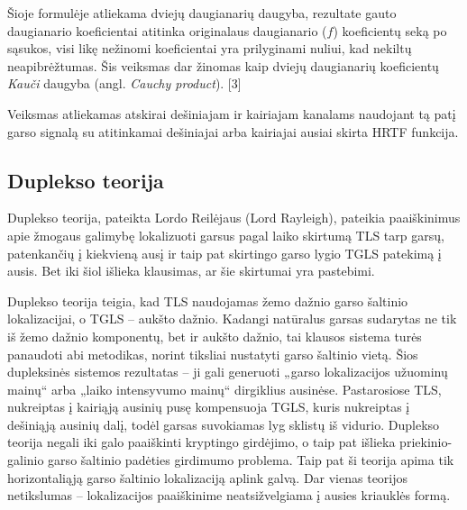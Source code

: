 \documentclass[]{vgtuef}
\begin{document}
Šioje formulėje atliekama dviejų daugianarių daugyba, rezultate gauto daugianario koeficientai atitinka originalaus daugianario ($f$) koeficientų seką po sąsukos, visi likę nežinomi koeficientai yra prilyginami nuliui, kad nekiltų neapibrėžtumas. Šis veiksmas dar žinomas kaip dviejų daugianarių koeficientų \textit{Kauči} daugyba (angl. \textit{Cauchy product}). [3]

Veiksmas atliekamas atskirai dešiniajam ir kairiajam kanalams naudojant tą patį garso signalą su atitinkamai dešiniajai arba kairiajai ausiai skirta HRTF funkcija.

\subsection{Duplekso teorija}

Duplekso teorija, pateikta Lordo Reilėjaus (Lord Rayleigh), pateikia paaiškinimus apie žmogaus galimybę lokalizuoti garsus pagal laiko skirtumą TLS tarp garsų, patenkančių į kiekvieną ausį ir taip pat skirtingo garso lygio TGLS patekimą į ausis. Bet iki šiol išlieka klausimas, ar šie skirtumai yra pastebimi.

Duplekso teorija teigia, kad TLS naudojamas žemo dažnio garso šaltinio lokalizacijai, o TGLS – aukšto dažnio. Kadangi natūralus garsas sudarytas ne tik iš žemo dažnio komponentų, bet ir aukšto dažnio, tai klausos sistema turės panaudoti abi metodikas, norint tiksliai nustatyti garso šaltinio vietą. Šios dupleksinės sistemos rezultatas – ji gali generuoti „garso lokalizacijos užuominų mainų“  arba „laiko intensyvumo mainų“ dirgiklius ausinėse. Pastarosiose TLS, nukreiptas į kairiąją ausinių pusę kompensuoja TGLS, kuris nukreiptas į dešiniąją ausinių dalį, todėl garsas suvokiamas lyg sklistų iš vidurio. Duplekso teorija negali iki galo paaiškinti kryptingo girdėjimo, o taip pat išlieka priekinio-galinio garso šaltinio padėties girdimumo problema. Taip pat ši teorija apima tik horizontaliąją garso šaltinio lokalizaciją aplink galvą. Dar vienas teorijos netikslumas – lokalizacijos paaiškinime neatsižvelgiama į ausies kriauklės formą.
\end{document}
